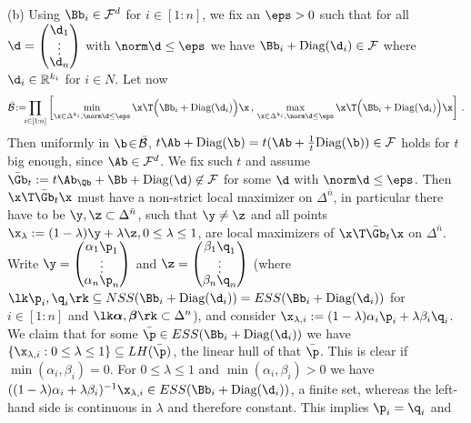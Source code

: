 \documentclass[moor]{informs3}              %
\def\irg#1#2{{ \in\! [{#1}\! : \! {#2}]}}
\def\sirg#1#2{{ \in\kern-.5pt [{#1}\kern-.5pt : \kern-.5pt {#2}]}}
\begin{document}
(b) Using $\Bb_i\in\mathcal{F}^d$ for $i\irg 1n$, we fix an $\eps>0$
such that for all
$\renewcommand*{\arraystretch}{.5}\d=\begin{pmatrix}\d_1 \\ \vdots \\ \d_n \end{pmatrix}$ with $\norm \d\le \eps$ we have $\Bb_i+\textup{Diag}(\d_i)\in \mathcal{F}$ where $\d_i\in\mathbb{R}^{k_i}$ for $i\in N$.
Let now
$$\mathcal{\bar B}\!:=\!\!\!\prod\limits_{i{\sirg 1n}}\left[\min\limits_{\x\in\Delta^{k_i},\norm\d\le\eps}\x\T\Big(\Bb_i+\textup{Diag}(\d_i)\Big)\x\, , \,
              \max\limits_{\x\in\Delta^{k_i},\norm\d\le\eps}\x\T\Big(\Bb_i+\textup{Diag}(\d_i)\Big)\x\right]\, .$$
Then uniformly in $\b\!\in\!\mathcal{\bar B}$, $t\Ab+\textup{Diag}(\b)=t(\Ab+\tfrac1t\textup{Diag}(\b))\in \mathcal{F}$ holds for $t$ big enough, since $\Ab\in\mathcal{F}^d$.
We fix such $t$ and assume $\bar\Gb_t:=t\Ab_\Qb+\Bb+\textup{Diag}(\d)\not\in\mathcal{F}$ for some $\d$ with $\norm \d\le\eps$. Then $\x\T\bar\Gb_t\x$ must have a non-strict local maximizer on $\Delta^{\bar n}$, in particular there have to be
$\y,\z\subset\Delta^{\bar n}$, such that $\y\ne\z$ and all points $\x_\lambda:=(1-\lambda)\y+\lambda\z, 0\le\lambda\le1$, are local maximizers of $\x\T\bar\Gb_t\x$ on $\Delta^{\bar n}$.
Write $\renewcommand*{\arraystretch}{.5}\y=\begin{pmatrix}\alpha_1\p_1 \\ \vdots \\ \alpha_n\p_n \end{pmatrix}$ and
$\z=\renewcommand*{\arraystretch}{.5}\begin{pmatrix}\beta_1\q_1 \\ \vdots \\ \beta_n\q_n \end{pmatrix}$ (where $\lk\p_i,\q_i\rk \subseteq NSS(\Bb_i+\textup{Diag}(\d_i)) = ESS(\Bb_i+\textup{Diag}(\d_i))$ for $i\irg 1n$ and $\lk\bm{\alpha},\bm{\beta}\rk\subset\Delta^n$),
and consider $\x_{\lambda,i}:=(1-\lambda)\alpha_i\p_i+\lambda\beta_i\q_i$. We claim that for some $\bar\p\in ESS(\Bb_i+\textup{Diag}(\d_i))$ we have $\{\x_{\lambda,i}:0\le\lambda\le1\}\subseteq LH(\bar\p)$, the linear hull of that $\bar\p$.
This is clear if $\min(\alpha_i,\beta_i)=0$.
For $0\le\lambda\le1$ and $\min(\alpha_i,\beta_i)>0$ we have
$((1-\lambda)\alpha_i+\lambda\beta_i)^{-1}\x_{\lambda,i}\in ESS(\Bb_i+\textup{Diag}(\d_i))$, a finite set, whereas the left-hand side is continuous in $\lambda$ and therefore constant. This implies $\p_i=\q_i$ and
\end{document}
